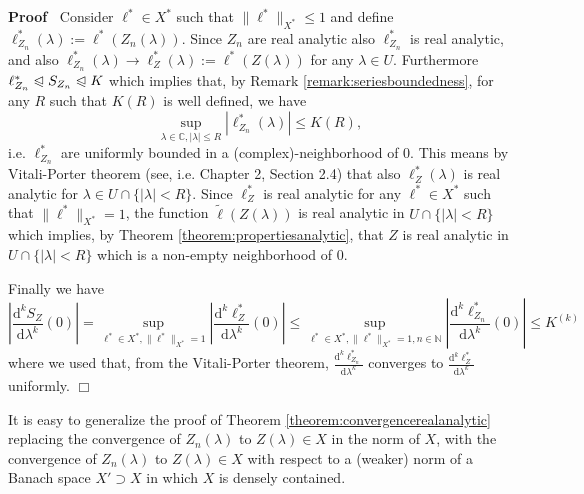 \documentclass{article}
\newcommand{\assign}{:=}
\newcommand{\mathd}{\mathrm{d}}
\newenvironment{proof}{\noindent\textbf{Proof\ }}{\hspace*{\fill}$\Box$\medskip}
\begin{document}
\begin{proof}
  Consider $\ell^{\ast} \in X^{\ast}$ such that $\| \ell^{\ast} \|_{X^{\ast}}
  \leqslant 1$ and define $\ell^{\ast}_{Z_n} (\lambda) \assign \ell^{\ast}
  (Z_n (\lambda))$. Since $Z_n$ are real analytic also $\ell^{\ast}_{Z_n}$ is
  real analytic, and also $\ell^{\ast}_{Z_n} (\lambda) \rightarrow
  \ell^{\ast}_Z (\lambda) \assign \ell^{\ast} (Z (\lambda))$ for any $\lambda
  \in U$. Furthermore $\ell^{\ast}_{Z_n} \trianglelefteqslant S_{Z_n}
  \trianglelefteqslant K$ which implies that, by Remark
  \ref{remark:seriesboundedness}, for any $R$ such that $K (R)$ is well
  defined, we have
  \[ \sup_{\lambda \in \mathbb{C}, | \lambda | \leqslant R} |
     \ell^{\ast}_{Z_n} (\lambda) | \leqslant K (R), \]
  i.e. $\ell^{\ast}_{Z_n}$ are uniformly bounded in a (complex)-neighborhood
  of $0$. This means by Vitali-Porter theorem (see, i.e. {\cite{Schiff1993}}
  Chapter 2, Section 2.4) that also $\ell^{\ast}_Z (\lambda)$ is real analytic
  for $\lambda \in U \cap \{ | \lambda | < R \}$. Since $\ell^{\ast}_Z$ is
  real analytic for any $\ell^{\ast} \in X^{\ast}$ such that $\| \ell^{\ast}
  \|_{X^{\ast}} = 1$, the function $\tilde{\ell} (Z (\lambda))$ is real
  analytic in $U \cap \{ | \lambda | < R \}$ which implies, by Theorem
  \ref{theorem:propertiesanalytic}, that $Z$ is real analytic in $U \cap \{ |
  \lambda | < R \}$ which is a non-empty neighborhood of $0$.
  
  Finally we have
  \[ \left| \frac{\mathd^k S_Z}{\mathd \lambda^k} (0) \right| =
     \sup_{\ell^{\ast} \in X^{\ast}, \| \ell^{\ast} \|_{X^{\ast}} = 1} \left|
     \frac{\mathd^k \ell^{\ast}_Z}{\mathd \lambda^k} (0) \right| \leqslant
     \sup_{\ell^{\ast} \in X^{\ast}, \| \ell^{\ast} \|_{X^{\ast}} = 1, n \in
     \mathbb{N}} \left| \frac{\mathd^k \ell^{\ast}_{Z_n}}{\mathd \lambda^k}
     (0) \right| \leqslant K^{(k)} \]
  where we used that, from the Vitali-Porter theorem, $\frac{\mathd^k
  \ell^{\ast}_{Z_n}}{\mathd \lambda^k}$ converges to $\frac{\mathd^k
  \ell^{\ast}_Z}{\mathd \lambda^k}$ uniformly.
\end{proof}

\begin{remark}
  \label{remark:extensionconvergence}It is easy to generalize the proof of
  Theorem \ref{theorem:convergencerealanalytic} replacing the convergence of
  $Z_n (\lambda)$ to $Z (\lambda) \in X$ in the norm of $X$, with the
  convergence of $Z_n (\lambda)$ to $Z (\lambda) \in X$ with respect to a
  (weaker) norm of a Banach space $X' \supset X$ in which $X$ is densely
  contained.
\end{remark}
\end{document}
